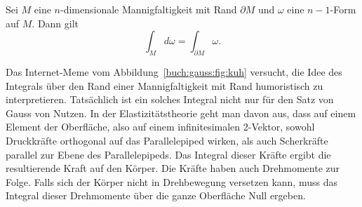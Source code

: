 \begin{satz}[Gauss]
Sei $M$ eine $n$-dimensionale Mannigfaltigkeit mit Rand $\partial M$
und $\omega$ eine $n-1$-Form auf $M$.
Dann gilt
\[
\int_M d\omega
=
\int_{\partial M} \omega.
\]
\end{satz}

%
Das Internet-Meme vom Abbildung~\ref{buch:gauss:fig:kuh} versucht,
die Idee des Integrals über den Rand einer Mannigfaltigkeit
mit Rand humoristisch zu interpretieren.
Tatsächlich ist ein solches Integral nicht nur für den Satz von Gauss
von Nutzen.
In der Elastizitätstheorie geht man davon aus, dass auf einem Element
der Oberfläche, also auf einem infinitesimalen 2-Vektor, sowohl Druckkräfte
orthogonal auf das Parallelepiped wirken, als auch Scherkräfte parallel 
zur Ebene des Parallelepipeds.
Das Integral dieser Kräfte ergibt die resultierende Kraft auf den Körper.
Die Kräfte haben auch Drehmomente zur Folge.
Falls sich der Körper nicht in Drehbewegung versetzen kann, muss
das Integral dieser Drehmomente über die ganze Oberfläche
Null ergeben.

